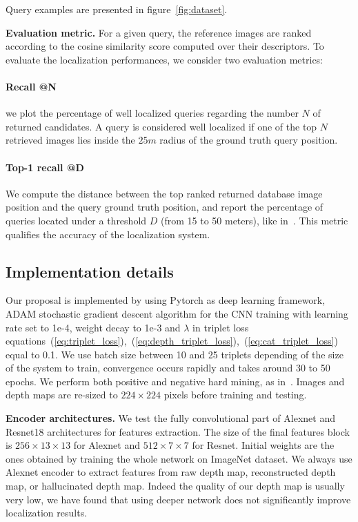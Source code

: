 \noindent Query examples are presented in figure~\ref{fig:dataset}.
	
\vspace{4pt}\noindent\textbf{Evaluation metric.} For a given query, the reference images are ranked according to the cosine similarity score computed over their descriptors. To evaluate the localization performances, we consider two evaluation metrics:
	\setcounter{paragraph}{0}
	\paragraph{Recall @N} we plot the percentage of well localized queries regarding the number $N$ of returned candidates. A query is considered well localized if one of the top $N$ retrieved images lies inside the $25m$ radius of the ground truth query position.
	\paragraph{Top-1 recall @D} We compute the distance between the top ranked returned database image position and the query ground truth position, and report the percentage of queries located under a threshold $D$ (from 15 to 50 meters), like in~\cite{Zamir2014}. This metric qualifies the accuracy of the localization system.

\subsection{Implementation details}
\label{subsec:implementation}

Our proposal is implemented by using Pytorch as deep learning framework, ADAM stochastic gradient descent algorithm for the CNN training with learning rate set to 1e-4, weight decay to 1e-3 and $\lambda$ in triplet loss equations~(\ref{eq:triplet_loss}),~(\ref{eq:depth_triplet_loss}),~(\ref{eq:cat_triplet_loss}) equal to 0.1. We use batch size between 10 and 25 triplets depending of the size of the system to train, convergence occurs rapidly and takes around 30 to 50 epochs. We perform both positive and negative hard mining, as in~\cite{Radenovic2017}. Images and depth maps are re-sized to $224\times224$ pixels before training and testing.

\vspace{4pt}\noindent\textbf{Encoder architectures.} We test the fully convolutional part of Alexnet and Resnet18 architectures for features extraction. The size of the final features block is $256\times13\times13$ for Alexnet and $512\times7\times7$ for Resnet. Initial weights are the ones obtained by training the whole network on ImageNet dataset. We always use Alexnet encoder to extract features from raw depth map, reconstructed depth map, or hallucinated depth map. Indeed the quality of our depth map is usually very low, we have found that using deeper network does not significantly improve localization results.

